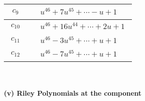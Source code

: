 \documentclass[1p]{elsarticle_modified}
\theoremstyle{definition}
\begin{document}
\begin{tabular}{m{50pt}|m{274pt}}
\hline $$\begin{aligned}c_{9}\end{aligned}$$&$\begin{aligned}
&u^{46}+7 u^{45}+\cdots- u+1
\end{aligned}$\\
\hline $$\begin{aligned}c_{10}\end{aligned}$$&$\begin{aligned}
&u^{46}+16 u^{44}+\cdots+2 u+1
\end{aligned}$\\
\hline $$\begin{aligned}c_{11}\end{aligned}$$&$\begin{aligned}
&u^{46}-3 u^{45}+\cdots+u+1
\end{aligned}$\\
\hline $$\begin{aligned}c_{12}\end{aligned}$$&$\begin{aligned}
&u^{46}-7 u^{45}+\cdots+u+1
\end{aligned}$\\
\hline
\end{tabular}\\~\\
\newpage\renewcommand{\arraystretch}{1}
\flushleft \textbf{(v) Riley Polynomials at the component}\newline \\
\end{document}
